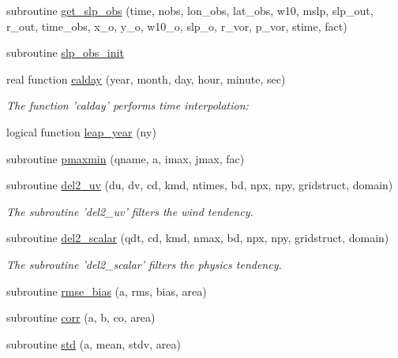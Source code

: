 \begin{DoxyCompactItemize}
subroutine \hyperlink{classfv__nwp__nudge__mod_a33970a757043357e1ddf2853c5d488ba}{get\-\_\-slp\-\_\-obs} (time, nobs, lon\-\_\-obs, lat\-\_\-obs, w10, mslp, slp\-\_\-out, r\-\_\-out, time\-\_\-obs, x\-\_\-o, y\-\_\-o, w10\-\_\-o, slp\-\_\-o, r\-\_\-vor, p\-\_\-vor, stime, fact)
\item 
subroutine \hyperlink{classfv__nwp__nudge__mod_ae667a55ffbd110b324b847e098e8c703}{slp\-\_\-obs\-\_\-init}
\item 
real function \hyperlink{classfv__nwp__nudge__mod_a65a3898d0634b9f134fd05985df6f76a}{calday} (year, month, day, hour, minute, sec)
\begin{DoxyCompactList}\small\item\em The function 'calday' performs time interpolation\-: \end{DoxyCompactList}\item 
logical function \hyperlink{classfv__nwp__nudge__mod_a396fbed122f17b39b587e3cd6645790d}{leap\-\_\-year} (ny)
\item 
subroutine \hyperlink{classfv__nwp__nudge__mod_a9fcca3e834cc3712596032598bcc44c5}{pmaxmin} (qname, a, imax, jmax, fac)
\item 
subroutine \hyperlink{classfv__nwp__nudge__mod_abc12568d2670b447a10653f727298cbe}{del2\-\_\-uv} (du, dv, cd, kmd, ntimes, bd, npx, npy, gridstruct, domain)
\begin{DoxyCompactList}\small\item\em The subroutine 'del2\-\_\-uv' filters the wind tendency. \end{DoxyCompactList}\item 
subroutine \hyperlink{classfv__nwp__nudge__mod_a31a4913add5b1f8b13999bd63b79a21e}{del2\-\_\-scalar} (qdt, cd, kmd, nmax, bd, npx, npy, gridstruct, domain)
\begin{DoxyCompactList}\small\item\em The subroutine 'del2\-\_\-scalar' filters the physics tendency. \end{DoxyCompactList}\item 
subroutine \hyperlink{classfv__nwp__nudge__mod_a74f89a2bcbb1e25d28f0e5429a85743c}{rmse\-\_\-bias} (a, rms, bias, area)
\item 
subroutine \hyperlink{classfv__nwp__nudge__mod_a12137129e53ec054657401b92f7ec8b4}{corr} (a, b, co, area)
\item 
subroutine \hyperlink{classfv__nwp__nudge__mod_abb31dc22f2b8f396e47957fa7a3c0e6c}{std} (a, mean, stdv, area)
\end{DoxyCompactItemize}
